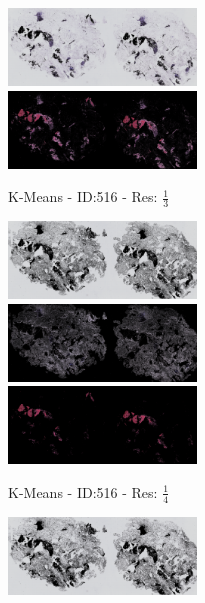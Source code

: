 \documentclass[letterpaper,10pt,oneside]{article}
\begin{document}
\begin{figure}[hbtp]
  \centering
  \begin{subfigure}[b]{5cm}
    \includegraphics[width=5cm]{visualization/results/kmeans/res_reduce_3/Region_1_PO13-00516A1_1_7_201305171148.png}
    \includegraphics[width=5cm]{visualization/results/kmeans/res_reduce_3/Region_2_PO13-00516A1_1_7_201305171148.png}
    \caption{K-Means - ID:516 - Res: $\frac{1}{3}$}
  \end{subfigure}
  \begin{subfigure}[b]{5cm}
    \includegraphics[width=5cm]{visualization/results/kmeans/res_reduce_4/Region_0_PO13-00516A1_1_7_201305171148.png}
    \includegraphics[width=5cm]{visualization/results/kmeans/res_reduce_4/Region_1_PO13-00516A1_1_7_201305171148.png}
    \includegraphics[width=5cm]{visualization/results/kmeans/res_reduce_4/Region_2_PO13-00516A1_1_7_201305171148.png}
    \caption{K-Means - ID:516 - Res: $\frac{1}{4}$}
  \end{subfigure}
  \begin{subfigure}[b]{5cm}
    \includegraphics[width=5cm]{visualization/results/kmeans/res_reduce_5/Region_2_PO13-00516A1_1_7_201305171148.png}

\end{subfigure}
\end{figure}
\end{document}
